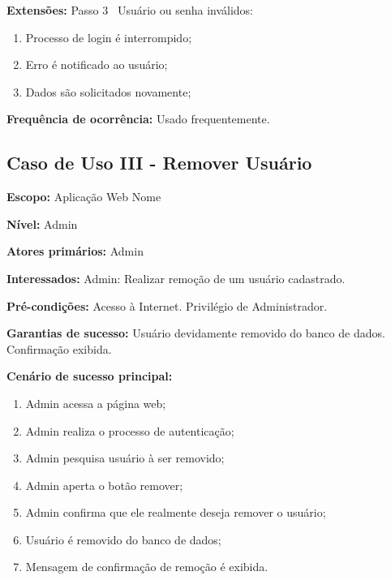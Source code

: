 \documentclass[12pt,oneside,a4paper,article]{abntex2}
\begin{document}
		\textbf{Extensões:} Passo 3 \textrightarrow \ Usuário ou senha inválidos:
		
		\begin{enumerate}[label=\alph*.]	
			\item Processo de login é interrompido;
			\item Erro é notificado ao usuário;
			\item Dados são solicitados novamente;	
		\end{enumerate}
		
		\textbf{Frequência de ocorrência:} Usado frequentemente.
		
		\subsection{Caso de Uso III - Remover Usuário}
				
		\textbf{Escopo:} Aplicação Web Nome
		
		\textbf{Nível:} Admin
		
		\textbf{Atores primários:} Admin
		
		\textbf{Interessados:} Admin: Realizar remoção de um usuário cadastrado.
		
		\textbf{Pré-condições:} Acesso à Internet. Privilégio de Administrador.
		
		\textbf{Garantias de sucesso:} Usuário devidamente removido do banco de dados. Confirmação exibida.
		
		\textbf{Cenário de sucesso principal:}
		
		\begin{enumerate}
			\item Admin acessa a página web;
			
			\item Admin realiza o processo de autenticação;
			
			\item Admin pesquisa usuário à ser removido;
			
			\item Admin aperta o botão remover;
			
			\item Admin confirma que ele realmente deseja remover o usuário;
			
			\item Usuário é removido do banco de dados;
			
			\item Mensagem de confirmação de remoção é exibida.
			
		\end{enumerate}
		
\end{document}
